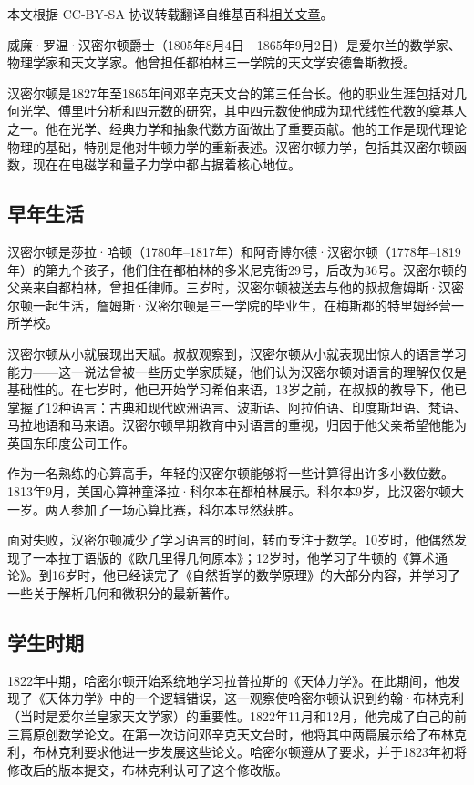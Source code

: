 
本文根据 CC-BY-SA 协议转载翻译自维基百科\href{https://en.wikipedia.org/wiki/William_Rowan_Hamilton}{相关文章}。

威廉·罗温·汉密尔顿爵士（1805年8月4日－1865年9月2日）是爱尔兰的数学家、物理学家和天文学家。他曾担任都柏林三一学院的天文学安德鲁斯教授。

汉密尔顿是1827年至1865年间邓辛克天文台的第三任台长。他的职业生涯包括对几何光学、傅里叶分析和四元数的研究，其中四元数使他成为现代线性代数的奠基人之一。他在光学、经典力学和抽象代数方面做出了重要贡献。他的工作是现代理论物理的基础，特别是他对牛顿力学的重新表述。汉密尔顿力学，包括其汉密尔顿函数，现在在电磁学和量子力学中都占据着核心地位。

\subsection{早年生活}  
汉密尔顿是莎拉·哈顿（1780年–1817年）和阿奇博尔德·汉密尔顿（1778年–1819年）的第九个孩子，他们住在都柏林的多米尼克街29号，后改为36号。汉密尔顿的父亲来自都柏林，曾担任律师。三岁时，汉密尔顿被送去与他的叔叔詹姆斯·汉密尔顿一起生活，詹姆斯·汉密尔顿是三一学院的毕业生，在梅斯郡的特里姆经营一所学校。

汉密尔顿从小就展现出天赋。叔叔观察到，汉密尔顿从小就表现出惊人的语言学习能力——这一说法曾被一些历史学家质疑，他们认为汉密尔顿对语言的理解仅仅是基础性的。在七岁时，他已开始学习希伯来语，13岁之前，在叔叔的教导下，他已掌握了12种语言：古典和现代欧洲语言、波斯语、阿拉伯语、印度斯坦语、梵语、马拉地语和马来语。汉密尔顿早期教育中对语言的重视，归因于他父亲希望他能为英国东印度公司工作。

作为一名熟练的心算高手，年轻的汉密尔顿能够将一些计算得出许多小数位数。1813年9月，美国心算神童泽拉·科尔本在都柏林展示。科尔本9岁，比汉密尔顿大一岁。两人参加了一场心算比赛，科尔本显然获胜。

面对失败，汉密尔顿减少了学习语言的时间，转而专注于数学。10岁时，他偶然发现了一本拉丁语版的《欧几里得几何原本》；12岁时，他学习了牛顿的《算术通论》。到16岁时，他已经读完了《自然哲学的数学原理》的大部分内容，并学习了一些关于解析几何和微积分的最新著作。
\subsection{学生时期}
1822年中期，哈密尔顿开始系统地学习拉普拉斯的《天体力学》。在此期间，他发现了《天体力学》中的一个逻辑错误，这一观察使哈密尔顿认识到约翰·布林克利（当时是爱尔兰皇家天文学家）的重要性。1822年11月和12月，他完成了自己的前三篇原创数学论文。在第一次访问邓辛克天文台时，他将其中两篇展示给了布林克利，布林克利要求他进一步发展这些论文。哈密尔顿遵从了要求，并于1823年初将修改后的版本提交，布林克利认可了这个修改版。

